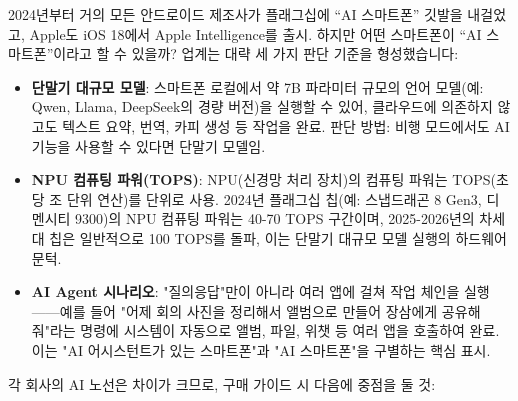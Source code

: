 


2024년부터 거의 모든 안드로이드 제조사가 플래그십에 “AI 스마트폰” 깃발을 내걸었고, Apple도 iOS 18에서 Apple Intelligence를 출시. 하지만 어떤 스마트폰이 “AI 스마트폰”이라고 할 수 있을까? 업계는 대략 세 가지 판단 기준을 형성했습니다:

\begin{itemize}
  \item \textbf{단말기 대규모 모델}: 스마트폰 로컬에서 약 7B 파라미터 규모의 언어 모델(예: Qwen, Llama, DeepSeek의 경량 버전)을 실행할 수 있어, 클라우드에 의존하지 않고도 텍스트 요약, 번역, 카피 생성 등 작업을 완료. 판단 방법: 비행 모드에서도 AI 기능을 사용할 수 있다면 단말기 모델임.
  \item \textbf{NPU 컴퓨팅 파워(TOPS)}: NPU(신경망 처리 장치)의 컴퓨팅 파워는 TOPS(초당 조 단위 연산)를 단위로 사용. 2024년 플래그십 칩(예: 스냅드래곤 8 Gen3, 디멘시티 9300)의 NPU 컴퓨팅 파워는 40-70 TOPS 구간이며, 2025-2026년의 차세대 칩은 일반적으로 100 TOPS를 돌파, 이는 단말기 대규모 모델 실행의 하드웨어 문턱.
  \item \textbf{AI Agent 시나리오}: "질의응답"만이 아니라 여러 앱에 걸쳐 작업 체인을 실행——예를 들어 "어제 회의 사진을 정리해서 앨범으로 만들어 장삼에게 공유해 줘"라는 명령에 시스템이 자동으로 앨범, 파일, 위챗 등 여러 앱을 호출하여 완료. 이는 "AI 어시스턴트가 있는 스마트폰"과 "AI 스마트폰"을 구별하는 핵심 표시.
\end{itemize}


각 회사의 AI 노선은 차이가 크므로, 구매 가이드 시 다음에 중점을 둘 것:

